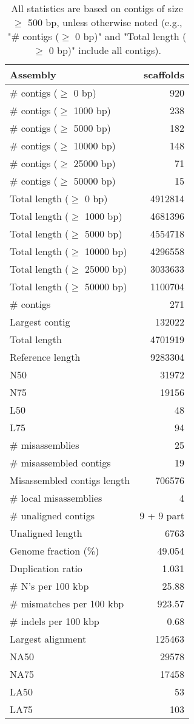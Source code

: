 \documentclass[12pt,a4paper]{article}
\begin{document}
\begin{table}[ht]
\begin{center}
\caption{All statistics are based on contigs of size $\geq$ 500 bp, unless otherwise noted (e.g., "\# contigs ($\geq$ 0 bp)" and "Total length ($\geq$ 0 bp)" include all contigs).}
\begin{tabular}{|l*{1}{|r}|}
\hline
Assembly & scaffolds \\ \hline
\# contigs ($\geq$ 0 bp) & 920 \\ \hline
\# contigs ($\geq$ 1000 bp) & 238 \\ \hline
\# contigs ($\geq$ 5000 bp) & 182 \\ \hline
\# contigs ($\geq$ 10000 bp) & 148 \\ \hline
\# contigs ($\geq$ 25000 bp) & 71 \\ \hline
\# contigs ($\geq$ 50000 bp) & 15 \\ \hline
Total length ($\geq$ 0 bp) & 4912814 \\ \hline
Total length ($\geq$ 1000 bp) & 4681396 \\ \hline
Total length ($\geq$ 5000 bp) & 4554718 \\ \hline
Total length ($\geq$ 10000 bp) & 4296558 \\ \hline
Total length ($\geq$ 25000 bp) & 3033633 \\ \hline
Total length ($\geq$ 50000 bp) & 1100704 \\ \hline
\# contigs & 271 \\ \hline
Largest contig & 132022 \\ \hline
Total length & 4701919 \\ \hline
Reference length & 9283304 \\ \hline
N50 & 31972 \\ \hline
N75 & 19156 \\ \hline
L50 & 48 \\ \hline
L75 & 94 \\ \hline
\# misassemblies & 25 \\ \hline
\# misassembled contigs & 19 \\ \hline
Misassembled contigs length & 706576 \\ \hline
\# local misassemblies & 4 \\ \hline
\# unaligned contigs & 9 + 9 part \\ \hline
Unaligned length & 6763 \\ \hline
Genome fraction (\%) & 49.054 \\ \hline
Duplication ratio & 1.031 \\ \hline
\# N's per 100 kbp & 25.88 \\ \hline
\# mismatches per 100 kbp & 923.57 \\ \hline
\# indels per 100 kbp & 0.68 \\ \hline
Largest alignment & 125463 \\ \hline
NA50 & 29578 \\ \hline
NA75 & 17458 \\ \hline
LA50 & 53 \\ \hline
LA75 & 103 \\ \hline
\end{tabular}
\end{center}
\end{table}
\end{document}
